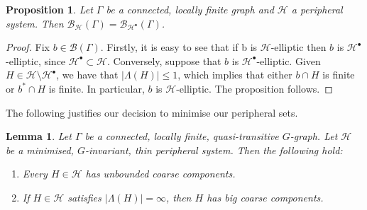 \documentclass[11pt,a4paper]{amsart}
\newtheorem{proposition}[theorem]{Proposition}
\newtheorem{lemma}[theorem]{Lemma}
\theoremstyle{definition}
\newcommand{\per}{\mathcal{H}}
\newcommand{\br}{{\mathscr{B}}}
\begin{document}
\begin{proposition}\label{prop:min-preserves-cuts}
    Let $\Gamma$ be a connected, locally finite graph and $\per$ a peripheral system. Then $\br_\per(\Gamma) = \br_{\per^\bullet}(\Gamma)$. 
\end{proposition}

\begin{proof}
    Fix $b \in \br (\Gamma)$. Firstly, it is easy to see that if b is $\per$-elliptic then $b$ is $\per^\bullet$-elliptic, since $\per^\bullet \subset \per$. 
    Conversely, suppose that $b$ is $\per^\bullet$-elliptic. Given $H \in \per \setminus \per^\bullet$, we have that $|\Lambda(H)| \leq 1$, which implies that either $b \cap H$ is finite or $b^\ast \cap H$ is finite. In particular, $b$ is $\per$-elliptic. The proposition follows.
\end{proof}


The following justifies our decision to minimise our peripheral sets. 







    



\begin{lemma}\label{lem:unbounded-coarse-comps}
    Let $\Gamma$ be a connected, locally finite, quasi-transitive $G$-graph. Let $\per$ be a minimised, $G$-invariant, thin peripheral system. Then the following hold:
    \begin{enumerate}
        \item\label{itm:unbounded-coarsecomps}  Every $H \in \per$ has unbounded coarse components.

        \item\label{itm:big-coarse-comps} If $H \in \per$ satisfies $|\Lambda(H)| = \infty$, then $H$ has big coarse components.
    \end{enumerate}
\end{lemma}
\end{document}
